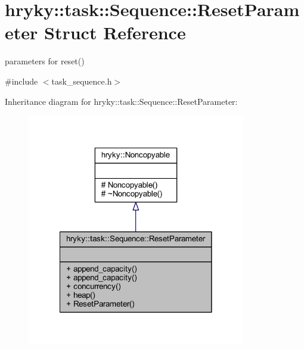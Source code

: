 \hypertarget{structhryky_1_1task_1_1_sequence_1_1_reset_parameter}{\section{hryky\-:\-:task\-:\-:Sequence\-:\-:Reset\-Parameter Struct Reference}
\label{structhryky_1_1task_1_1_sequence_1_1_reset_parameter}
}


parameters for reset()  




{\ttfamily \#include $<$task\-\_\-sequence.\-h$>$}



Inheritance diagram for hryky\-:\-:task\-:\-:Sequence\-:\-:Reset\-Parameter\-:\nopagebreak
\begin{figure}[H]
\begin{center}
\leavevmode
\includegraphics[width=270pt]{structhryky_1_1task_1_1_sequence_1_1_reset_parameter__inherit__graph}
\end{center}
\end{figure}
